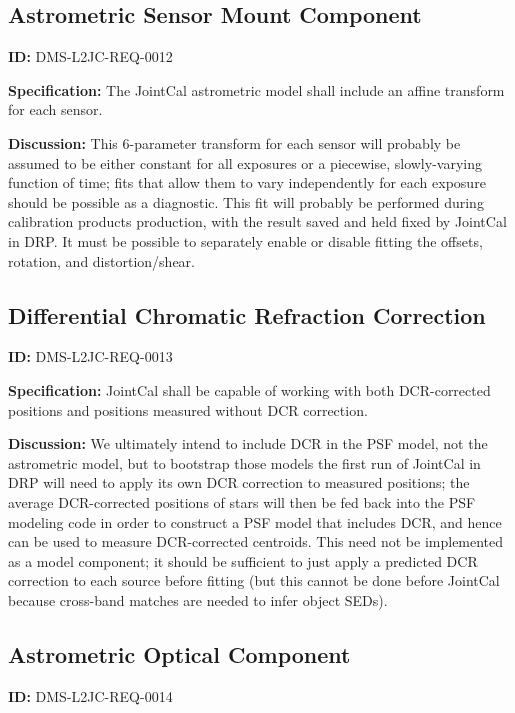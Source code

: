 \documentclass[SE,toc,lsstdraft]{lsstdoc}
\begin{document}
\subsection{Astrometric Sensor Mount Component}

\label{DMS-L2JC-REQ-0012}
\textbf{ID:} DMS-L2JC-REQ-0012

\textbf{Specification:}
The JointCal astrometric model shall include an affine transform for each sensor.

\textbf{Discussion:}
This 6-parameter transform for each sensor will probably be assumed to be either constant for all exposures or a piecewise, slowly-varying function of time; fits that allow them to vary independently for each exposure should be possible as a diagnostic.  This fit will probably be performed during calibration products production, with the result saved and held fixed by JointCal in DRP.  It must be possible to separately enable or disable fitting the offsets, rotation, and distortion/shear.

\subsection{Differential Chromatic Refraction Correction}

\label{DMS-L2JC-REQ-0013}
\textbf{ID:} DMS-L2JC-REQ-0013

\textbf{Specification:}
JointCal shall be capable of working with both DCR-corrected positions and positions measured without DCR correction.

\textbf{Discussion:}
We ultimately intend to include DCR in the PSF model, not the astrometric model, but to bootstrap those models the first run of JointCal in DRP will need to apply its own DCR correction to measured positions; the average DCR-corrected positions of stars will then be fed back into the PSF modeling code in order to construct a PSF model that includes DCR, and hence can be used to measure DCR-corrected centroids.  This need not be implemented as a model component; it should be sufficient to just apply a predicted DCR correction to each source before fitting (but this cannot be done before JointCal because cross-band matches are needed to infer object SEDs).

\subsection{Astrometric Optical Component}

\label{DMS-L2JC-REQ-0014}
\textbf{ID:} DMS-L2JC-REQ-0014
\end{document}

